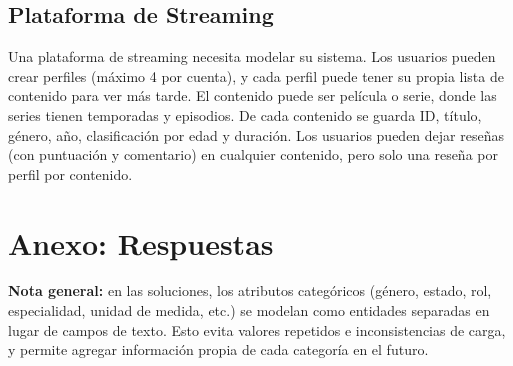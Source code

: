 \documentclass[12pt]{article}
\begin{document}
\subsection{Plataforma de Streaming}
Una plataforma de streaming necesita modelar su sistema. Los usuarios pueden crear perfiles (máximo 4 por cuenta), y cada perfil puede tener su propia lista de contenido para ver más tarde. El contenido puede ser película o serie, donde las series tienen temporadas y episodios. De cada contenido se guarda ID, título, género, año, clasificación por edad y duración. Los usuarios pueden dejar reseñas (con puntuación y comentario) en cualquier contenido, pero solo una reseña por perfil por contenido.

\newpage
\section{Anexo: Respuestas}

\textbf{Nota general:} en las soluciones, los atributos categóricos (género, estado, rol, especialidad, unidad de medida, etc.) se modelan como entidades separadas en lugar de campos de texto. Esto evita valores repetidos e inconsistencias de carga, y permite agregar información propia de cada categoría en el futuro.
\end{document}
